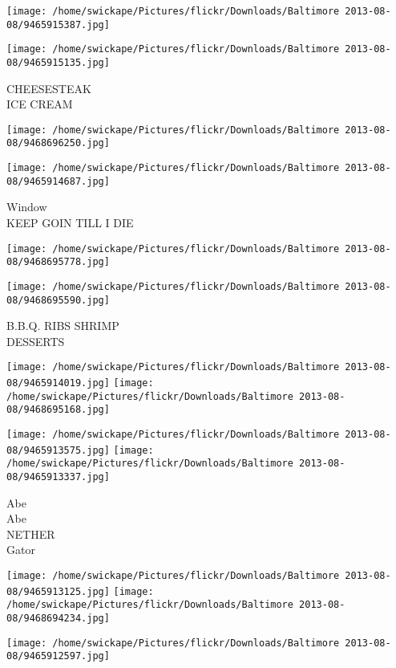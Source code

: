 \documentclass[10pt,letterpaper]{article}
\begin{document}
\texttt{[image: /home/swickape/Pictures/flickr/Downloads/Baltimore 2013-08-08/9465915387.jpg]}

\vspace{0.25in}
\texttt{[image: /home/swickape/Pictures/flickr/Downloads/Baltimore 2013-08-08/9465915135.jpg]}

CHEESESTEAK\\
ICE CREAM
\pagebreak

\texttt{[image: /home/swickape/Pictures/flickr/Downloads/Baltimore 2013-08-08/9468696250.jpg]}

\vspace{0.25in}
\texttt{[image: /home/swickape/Pictures/flickr/Downloads/Baltimore 2013-08-08/9465914687.jpg]}

Window\\
KEEP GOIN TILL I DIE
\pagebreak

\texttt{[image: /home/swickape/Pictures/flickr/Downloads/Baltimore 2013-08-08/9468695778.jpg]}

\vspace{0.25in}
\texttt{[image: /home/swickape/Pictures/flickr/Downloads/Baltimore 2013-08-08/9468695590.jpg]}

B.B.Q. RIBS SHRIMP\\
DESSERTS
\pagebreak

\texttt{[image: /home/swickape/Pictures/flickr/Downloads/Baltimore 2013-08-08/9465914019.jpg]}
\texttt{[image: /home/swickape/Pictures/flickr/Downloads/Baltimore 2013-08-08/9468695168.jpg]}

\texttt{[image: /home/swickape/Pictures/flickr/Downloads/Baltimore 2013-08-08/9465913575.jpg]}
\texttt{[image: /home/swickape/Pictures/flickr/Downloads/Baltimore 2013-08-08/9465913337.jpg]}

Abe\\
Abe\\
NETHER\\
Gator
\pagebreak

\texttt{[image: /home/swickape/Pictures/flickr/Downloads/Baltimore 2013-08-08/9465913125.jpg]}
\texttt{[image: /home/swickape/Pictures/flickr/Downloads/Baltimore 2013-08-08/9468694234.jpg]}

\vspace{0.25in}
\texttt{[image: /home/swickape/Pictures/flickr/Downloads/Baltimore 2013-08-08/9465912597.jpg]}
\end{document}
